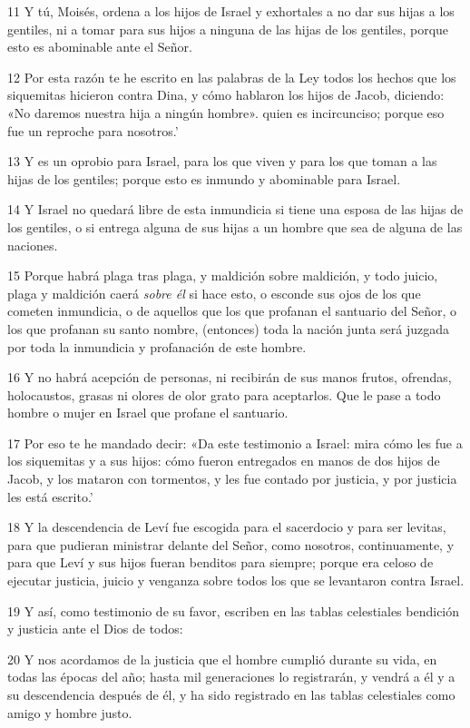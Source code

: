 \par 11 Y tú, Moisés, ordena a los hijos de Israel y exhortales a no dar sus hijas a los gentiles, ni a tomar para sus hijos a ninguna de las hijas de los gentiles, porque esto es abominable ante el Señor.
\par 12 Por esta razón te he escrito en las palabras de la Ley todos los hechos que los siquemitas hicieron contra Dina, y cómo hablaron los hijos de Jacob, diciendo: «No daremos nuestra hija a ningún hombre». quien es incircunciso; porque eso fue un reproche para nosotros.'
\par 13 Y es un oprobio para Israel, para los que viven y para los que toman a las hijas de los gentiles; porque esto es inmundo y abominable para Israel.
\par 14 Y Israel no quedará libre de esta inmundicia si tiene una esposa de las hijas de los gentiles, o si entrega alguna de sus hijas a un hombre que sea de alguna de las naciones.
\par 15 Porque habrá plaga tras plaga, y maldición sobre maldición, y todo juicio, plaga y maldición caerá \textit{sobre él} si hace esto, o esconde sus ojos de los que cometen inmundicia, o de aquellos que los que profanan el santuario del Señor, o los que profanan su santo nombre, (entonces) toda la nación junta será juzgada por toda la inmundicia y profanación de este hombre.
\par 16 Y no habrá acepción de personas, ni recibirán de sus manos frutos, ofrendas, holocaustos, grasas ni olores de olor grato para aceptarlos. Que le pase a todo hombre o mujer en Israel que profane el santuario.
\par 17 Por eso te he mandado decir: «Da este testimonio a Israel: mira cómo les fue a los siquemitas y a sus hijos: cómo fueron entregados en manos de dos hijos de Jacob, y los mataron con tormentos, y les fue contado por justicia, y por justicia les está escrito.'
\par 18 Y la descendencia de Leví fue escogida para el sacerdocio y para ser levitas, para que pudieran ministrar delante del Señor, como nosotros, continuamente, y para que Leví y sus hijos fueran benditos para siempre; porque era celoso de ejecutar justicia, juicio y venganza sobre todos los que se levantaron contra Israel.
\par 19 Y así, como testimonio de su favor, escriben en las tablas celestiales bendición y justicia ante el Dios de todos:
\par 20 Y nos acordamos de la justicia que el hombre cumplió durante su vida, en todas las épocas del año; hasta mil generaciones lo registrarán, y vendrá a él y a su descendencia después de él, y ha sido registrado en las tablas celestiales como amigo y hombre justo.

